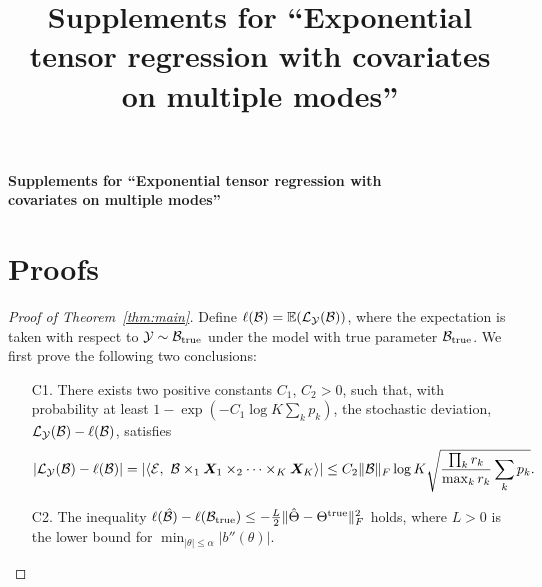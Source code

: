 \documentclass[11pt]{article}
\title{Supplements for ``Exponential tensor regression with covariates on multiple modes''}
\theoremstyle{plain}
\theoremstyle{definition}
\begin{document}
\begin{center}
\begin{spacing}{1.5}
\textbf{\Large Supplements for ``Exponential tensor regression with \\
covariates on multiple modes''}
\end{spacing}
\end{center}

\section{Proofs}
\begin{proof}[Proof of Theorem~\ref{thm:main}]
Define $\ell(\mathcal{B})=\mathbb{E}(\mathcal{L}_{\mathcal{Y}}(\mathcal{B}))$, where the expectation is taken with respect to $\mathcal{Y}\sim \mathcal{B}_{\text{true}}$ under the model with true parameter $\mathcal{B}_{\text{true}}$. We first prove the following two conclusions:
\begin{enumerate}
\item[C1.] There exists two positive constants $C_1$, $C_2>0$, such that, with probability at least $1-\exp(-C_1\log K\sum_k p_k)$, the stochastic deviation, $\mathcal{L}_{\mathcal{Y}}(\mathcal{B})-\ell(\mathcal{B})$, satisfies
\[
|\tL_{\tY}(\tB)-\ell(\tB)|=|\langle \tE,\ \tB\times_1\mX_1\times_2\cdots\times_K \mX_K\rangle| \leq C_2\FnormSize{}{\tB} \log K\sqrt{{\prod_k r_k \over \max_k r_k} \sum_k p_k}.
\]
\item[C2.] The inequality $\ell(\hat {\mathcal{B}}) - \ell(\mathcal{B}_{\text{true}}) \leq  -{L\over 2}\lVert\hat \Theta-\Theta^{\text{true}}\rVert_F^2$ holds, where $L>0$ is the lower bound for $\min_{|\theta|\leq \alpha}|b''(\theta)|$. 
\end{enumerate}


\end{proof}
\end{document}
